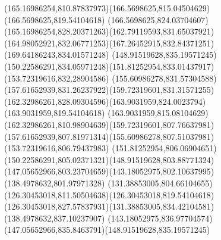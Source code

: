 {{\curveto(165.16986254,810.87837973)(166.5698625,815.04504629)(166.5698625,819.54104618)
\curveto(166.5698625,824.03704607)(165.16986254,828.20371263)(162.79119593,831.65037921)
\curveto(164.98052921,832.06771253)(167.26452915,832.84371251)(169.64186243,834.01571248)
\moveto(148.91519628,835.19571245)
\curveto(150.22586291,834.05971248)(151.81252954,833.01437917)(153.72319616,832.28904586)
\curveto(155.60986278,831.57304588)(157.61652939,831.26237922)(159.72319601,831.31571255)
\curveto(162.32986261,828.09304596)(163.9031959,824.0023794)(163.9031959,819.54104618)
\curveto(163.9031959,815.08104629)(162.32986261,810.98904639)(159.72319601,807.76637981)
\curveto(157.61652939,807.81971314)(155.60986278,807.51037981)(153.72319616,806.79437983)
\curveto(151.81252954,806.06904651)(150.22586291,805.02371321)(148.91519628,803.88771324)
\curveto(147.05652966,803.23704659)(143.18052975,802.10637995)(138.4978632,801.97971328)
\curveto(131.38853005,804.66104655)(126.30453018,811.50504638)(126.30453018,819.54104618)
\curveto(126.30453018,827.57837931)(131.38853005,834.42104581)(138.4978632,837.10237907)
\curveto(143.18052975,836.97704574)(147.05652966,835.8463791)(148.91519628,835.19571245)
}
}

